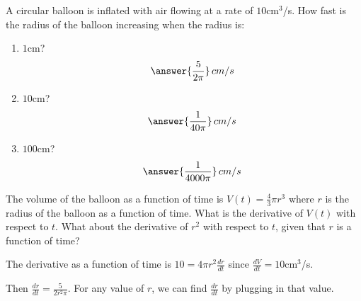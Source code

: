 \documentclass{ximera}
\author{Gregory Hartman \and Matthew Carr}
\begin{document}
\begin{exercise}



A circular balloon is inflated with air flowing at a rate of $10$cm$^3$/s. How fast is the radius of the balloon increasing when the radius is: \begin{enumerate}
\item		$1$cm? \[\answer{\frac{5}{2\pi}}\,cm/s\]
\item		$10$cm? \[\answer{\frac{1}{40\pi}}\,cm/s\]
\item		$100$cm? \[\answer{\frac{1}{4000\pi}}\,cm/s\]

\end{enumerate}

\begin{hint}
The volume of the balloon as a function of time is $V(t)=\frac{4}{3}\pi r^3$ where $r$ is the radius of the balloon as a function of time. What is the derivative of $V(t)$ with respect to $t$. What about the derivative of $r^2$ with respect to $t$, given that $r$ is a function of time?
\end{hint}
\begin{hint}
The derivative as a function of time is $10=4\pi r^2\frac{dr}{dt}$ since $\frac{dV}{dt}=10$cm$^3$/s.
\end{hint}
\begin{hint}
Then $\frac{dr}{dt}=\frac{5}{2r^2\pi}$. For any value of $r$, we can find $\frac{dr}{dt}$ by plugging in that value.
\end{hint}
\end{exercise}
\end{document}
